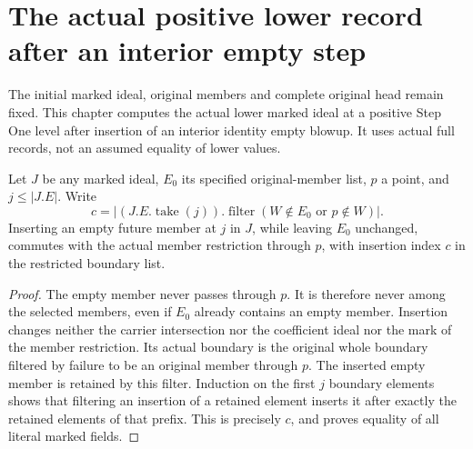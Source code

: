 \section{The actual positive lower record after an interior empty step}

The initial marked ideal, original members and complete original head remain
fixed.  This chapter computes the actual lower marked ideal at a positive
Step One level after insertion of an interior identity empty blowup.  It uses
actual full records, not an assumed equality of lower values.

\begin{lemma}
\label{hir:interior-future-empty-member-restriction}
\leanok
{}
Let $J$ be any marked ideal, $E_0$ its specified original-member list,
$p$ a point, and $j\leq |J.E|$.  Write
\[
 c=\bigl|(J.E.\operatorname{take}(j)).\operatorname{filter}
       (W\notin E_0\text{ or }p\notin W)\bigr|.
\]
Inserting an empty future member at $j$ in $J$, while leaving $E_0$ unchanged,
commutes with the actual member restriction through $p$, with insertion
index $c$ in the restricted boundary list.
\end{lemma}
\begin{proof}
The empty member never passes through $p$.  It is therefore never among the
selected members, even if $E_0$ already contains an empty member.  Insertion
changes neither the carrier intersection nor the coefficient ideal nor the
mark of the member restriction.  Its actual boundary is the original whole
boundary filtered by failure to be an original member through $p$.
The inserted empty member is retained by this filter.  Induction on the
first $j$ boundary elements shows that filtering an insertion of a retained
element inserts it after exactly the retained elements of that prefix.
This is precisely $c$, and proves equality of all literal marked fields.
\end{proof}

